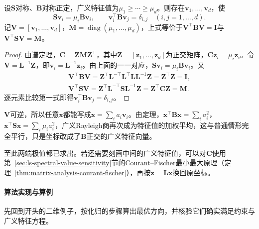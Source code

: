 \begin{theorem}[$\bm B$正交的广义特征向量]
\label{thm:ls-generalized-eigen-b-orthogonal}
设$\bm S$对称、$\bm B$对称正定，广义特征值为$\mu_1\geq\cdots\geq\mu_d$。则存在$\bm v_1,\ldots,\bm v_d$，使
\[
 \bm S\bm v_i=\mu_i\bm B\bm v_i,\qquad \bm v_i^\top\bm B\bm v_j=\delta_{i,j}\quad(i,j=1,\ldots,d).
\]
记$\bm V=[\bm v_1,\ldots,\bm v_d]$，$\bm M=\operatorname{diag}(\mu_1,\ldots,\mu_d)$，上式等价于$\bm V^\top\bm B\bm V=\bm I$与$\bm V^\top\bm S\bm V=\bm M$。
\end{theorem}
\begin{proof}
由谱定理，$\bm C=\bm Z\bm M\bm Z^\top$，其中$\bm Z=[\bm z_1,\ldots,\bm z_d]$为正交矩阵，$\bm C\bm z_i=\mu_i\bm z_i$。令$\bm V=\bm L^{-1}\bm Z$，即$\bm v_i=\bm L^{-1}\bm z_i$。由上面的一一对应，$\bm S\bm v_i=\mu_i\bm B\bm v_i$。又
\[
\begin{gathered}
 \bm V^\top\bm B\bm V=\bm Z^\top\bm L^{-\top}\bm L^\top\bm L\bm L^{-1}\bm Z=\bm Z^\top\bm Z=\bm I,\\
 \bm V^\top\bm S\bm V=\bm Z^\top\bm L^{-\top}\bm S\bm L^{-1}\bm Z=\bm Z^\top\bm C\bm Z=\bm M .
\end{gathered}
\]
逐元素比较第一式即得$\bm v_i^\top\bm B\bm v_j=\delta_{i,j}$。
\end{proof}

$\bm V$可逆，所以任意$\bm x$都能写成$\bm x=\sum_ia_i\bm v_i$。由定理，$\bm x^\top\bm B\bm x=\sum_ia_i^2$，$\bm x^\top\bm S\bm x=\sum_i\mu_ia_i^2$，广义Rayleigh商再次成为特征值的加权平均，这与普通情形完全平行，只是坐标改成了$\bm B$正交的广义特征向量。

至此两端极值都已求出。若还需要刻画中间的广义特征值，可以对$\bm C$使用第~\ref{sec:ls-spectral-value-sensitivity}节的Courant--Fischer最小最大原理（定理~\ref{thm:matrix-analysis-courant-fischer}），再按$\bm z=\bm L\bm x$换回原坐标。

\paragraph{算法实现与算例}

先回到开头的二维例子，按化归的步骤算出最优方向，并核验它们确实满足约束与广义特征方程。


